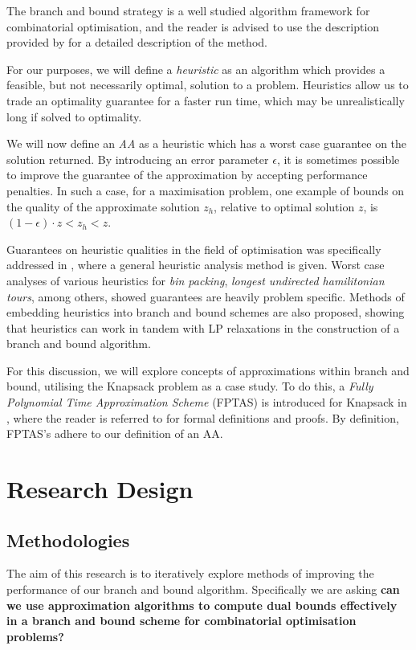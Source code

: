 \documentclass[12pt, a4paper]{article}
\begin{document}
The branch and bound strategy is a well studied algorithm framework for combinatorial optimisation, and the reader is advised to use the description provided by \cite{BOOK:1} for a detailed description of the method.

For our purposes, we will define a \textit{heuristic} as an algorithm which provides a feasible, but not necessarily optimal, solution to a problem. Heuristics allow us to trade an optimality guarantee for a faster run time, which may be unrealistically long if solved to optimality.

We will now define an \textit{AA} as a heuristic which has a worst case guarantee on the solution returned. By introducing an error parameter $\epsilon$, it is sometimes possible to improve the guarantee of the approximation by accepting performance penalties. In such a case, for a maximisation problem, one example of bounds on the quality of the approximate solution $z_h$, relative to optimal solution $z$, is $(1-\epsilon)\cdot z < z_h < z$.   

Guarantees on heuristic qualities in the field of optimisation was specifically addressed in \cite{WOSLEY}, where a general heuristic analysis method is given. Worst case analyses of various heuristics for \textit{bin packing}, \textit{longest undirected hamilitonian tours}, among others, showed guarantees are heavily problem specific. Methods of embedding heuristics into branch and bound schemes are also proposed, showing that heuristics can work in tandem with LP relaxations in the construction of a branch and bound algorithm.

For this discussion, we will explore concepts of approximations within branch and bound, utilising the Knapsack problem as a case study. To do this, a \textit{Fully Polynomial Time Approximation Scheme} (FPTAS) is introduced for Knapsack in \cite{BOOK:2}, where the reader is referred to for formal definitions and proofs. By definition, FPTAS's adhere to our definition of an AA.



\section{Research Design}

\subsection{Methodologies}

The aim of this research is to iteratively explore methods of improving the performance of our branch and bound algorithm. Specifically we are asking \textbf{can we use approximation algorithms to compute dual bounds effectively in a branch and bound scheme for combinatorial optimisation problems?}
\end{document}
